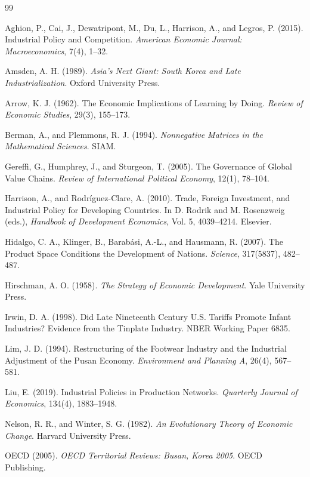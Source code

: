 \begin{thebibliography}{99}

Aghion, P., Cai, J., Dewatripont, M., Du, L., Harrison, A., and Legros, P. (2015).
Industrial Policy and Competition.
\emph{American Economic Journal: Macroeconomics}, 7(4), 1--32.

Amsden, A. H. (1989).
\emph{Asia's Next Giant: South Korea and Late Industrialization}.
Oxford University Press.

Arrow, K. J. (1962).
The Economic Implications of Learning by Doing.
\emph{Review of Economic Studies}, 29(3), 155--173.

Berman, A., and Plemmons, R. J. (1994).
\emph{Nonnegative Matrices in the Mathematical Sciences}.
SIAM.

Gereffi, G., Humphrey, J., and Sturgeon, T. (2005).
The Governance of Global Value Chains.
\emph{Review of International Political Economy}, 12(1), 78--104.

Harrison, A., and Rodr\'iguez-Clare, A. (2010).
Trade, Foreign Investment, and Industrial Policy for Developing Countries.
In D. Rodrik and M. Rosenzweig (eds.), \emph{Handbook of Development Economics}, Vol. 5, 4039--4214.
Elsevier.

Hidalgo, C. A., Klinger, B., Barab\'asi, A.-L., and Hausmann, R. (2007).
The Product Space Conditions the Development of Nations.
\emph{Science}, 317(5837), 482--487.

Hirschman, A. O. (1958).
\emph{The Strategy of Economic Development}.
Yale University Press.

Irwin, D. A. (1998).
Did Late Nineteenth Century U.S. Tariffs Promote Infant Industries? Evidence from the Tinplate Industry.
NBER Working Paper 6835.

Lim, J. D. (1994).
Restructuring of the Footwear Industry and the Industrial Adjustment of the Pusan Economy.
\emph{Environment and Planning A}, 26(4), 567--581.

Liu, E. (2019).
Industrial Policies in Production Networks.
\emph{Quarterly Journal of Economics}, 134(4), 1883--1948.

Nelson, R. R., and Winter, S. G. (1982).
\emph{An Evolutionary Theory of Economic Change}.
Harvard University Press.

OECD (2005).
\emph{OECD Territorial Reviews: Busan, Korea 2005}.
OECD Publishing.


\end{thebibliography}
